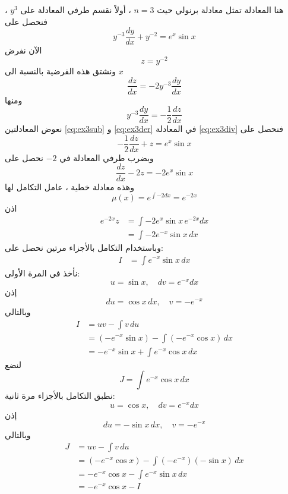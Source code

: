 \begin{solution}
	هنا المعادلة تمثل معادلة برنولي حيث $n=3$ ، أولاً نقسم طرفي المعادلة على $y^3$ ، فنحصل على
	\begin{equation}
		\label{eq:ex3div}
		y^{-3}\frac{dy}{dx} + y^{-2} = e^{x}\sin x
	\end{equation}
	الآن نفرض
	\begin{equation}
		\label{eq:ex3sub}
		z = y^{-2}
	\end{equation}
	ونشتق هذه الفرضية بالنسبة الى $x$
	\begin{equation}
		\label{eq:ex3der}
		\frac{dz}{dx} = -2 y^{-3}\frac{dy}{dx}
	\end{equation}
	ومنها
	\[
	y^{-3}\frac{dy}{dx} = -\frac{1}{2}\frac{dz}{dx}
	\]
	نعوض المعادلتين 
	\eqref{eq:ex3sub} و \eqref{eq:ex3der} في المعادلة \eqref{eq:ex3div} فنحصل على
	\[
	-\frac{1}{2}\frac{dz}{dx} + z = e^{x}\sin x
	\]
	وبضرب طرفي المعادلة في $-2$ نحصل على
	\begin{equation}
		\label{eq:ex3linear}
		\frac{dz}{dx} - 2z = -2 e^{x}\sin x
	\end{equation}
	وهذه معادلة خطية ، عامل التكامل لها
	\[
	\mu(x) = e^{\int -2 dx} = e^{-2x}
	\]
	اذن
	\begin{align*}
		e^{-2x} z &= \int -2 e^{x}\sin x \, e^{-2x} dx \\
		&= \int -2 e^{-x}\sin x \, dx
	\end{align*}وباستخدام التكامل بالأجزاء مرتين نحصل على:
	\begin{align*}
	I &= \int e^{-x}\sin x \, dx
	\end{align*}
	نأخذ في المرة الأولى:
	\[
	u = \sin x , \quad dv = e^{-x} dx
	\]
	إذن
	\[
	du = \cos x \, dx , \quad v = -e^{-x}
	\]
	وبالتالي
	\begin{align*}
	I &= uv - \int v \, du \\
	&= (-e^{-x}\sin x) - \int (-e^{-x}\cos x)\, dx \\
	&= -e^{-x}\sin x + \int e^{-x}\cos x \, dx
	\end{align*}
	لنضع
	\[
	J = \int e^{-x}\cos x \, dx
	\]
	نطبق التكامل بالأجزاء مرة ثانية:
	\[
	u = \cos x , \quad dv = e^{-x} dx
	\]
	إذن
	\[
	du = -\sin x \, dx , \quad v = -e^{-x}
	\]
	وبالتالي
	\begin{align*}
	J &= uv - \int v \, du \\
	&= (-e^{-x}\cos x) - \int (-e^{-x})(-\sin x)\, dx \\
	&= -e^{-x}\cos x - \int e^{-x}\sin x \, dx \\
	&= -e^{-x}\cos x - I
	\end{align*}

\end{solution}
